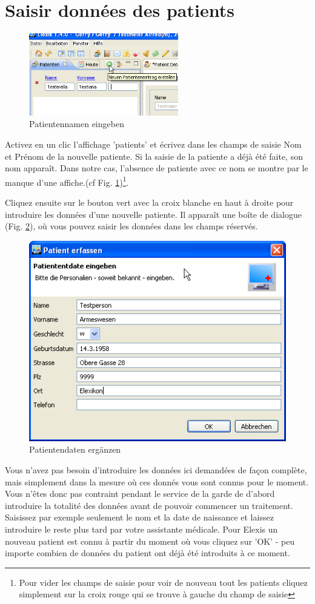 \section{Saisir données des patients}
\begin{figure}
	\includegraphics[width=6.5cm]{images/einf1}
	\caption{Patientennamen eingeben}\label{fig:patname}
\end{figure}
Activez en un clic l'affichage 'patients' et écrivez dans les champs de saisie Nom et Prénom de la nouvelle patiente.
Si la saisie de la patiente a déjà été faite, son nom apparaît. Dans notre cas, l'absence de patiente avec ce nom se montre par le manque d'une affiche.(cf Fig. \ref{fig:patname})\footnote{Pour vider les champs de saisie pour voir de nouveau tout les patients cliquez simplement sur la croix rouge qui se trouve à gauche du champ de saisie}.

Cliquez ensuite sur le bouton vert avec la croix blanche en haut à droite pour introduire les
données d'une nouvelle patiente.
Il apparaît une boîte de dialogue (Fig. \ref{fig:patdata}), où vous pouvez saisir les données dans les champs réservés.\\
\bigskip

\begin{figure}[ht]
	\includegraphics{images/einf2}
	\caption{Patientendaten ergänzen}
	\label{fig:patdata}
\end{figure}
Vous n'avez pas besoin d'introduire les données ici demandées de façon complète, mais simplement dans la mesure où ces donnés vous sont connus pour le moment. Vous n'êtes donc pas contraint pendant le service de la garde de d'abord introduire la totalité des données avant de pouvoir commencer un traitement.
Saisissez par exemple seulement le nom et la date de naissance et laissez introduire le reste plus tard par votre assistante médicale. Pour Elexis un nouveau patient est connu à partir du moment où vous cliquez sur 'OK' - peu importe combien de données du patient ont déjà été introduits à ce moment.


